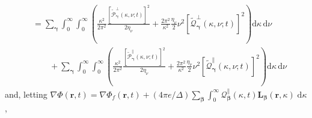 \documentclass{article}
\begin{document}
\begin{equation}
\begin{split}
&= \sum_{\bm{\gamma}}\int_0^\infty\int_0^\infty\left(\frac{\kappa^2}{2\pi^2}\frac{\left[\tilde{\mathcal{P}}_{\bm{\gamma}}^\perp(\kappa,\nu;t)\right]^2}{2\eta_\nu} + \frac{2\pi^2}{\kappa^2}\frac{\eta_\nu}{2}\nu^2\left[\tilde{\mathcal{Q}}_{\bm{\gamma}}^\perp(\kappa,\nu;t)\right]^2\right)\mathrm{d}\kappa\,\mathrm{d}\nu\\
&\qquad + \sum_{\bm{\gamma}}\int_0^\infty\int_0^\infty\left(\frac{\kappa^2}{2\pi^2}\frac{\left[\tilde{\mathcal{P}}_{\bm{\gamma}}^\parallel(\kappa,\nu;t)\right]^2}{2\eta_\nu} + \frac{2\pi^2}{\kappa^2}\frac{\eta_\nu}{2}\nu^2\left[\tilde{\mathcal{Q}}_{\bm{\gamma}}^\parallel(\kappa,\nu;t)\right]^2\right)\mathrm{d}\kappa\,\mathrm{d}\nu
\end{split}
\end{equation}
and, letting $\nabla\Phi(\mathbf{r},t) = \nabla\Phi_f(\mathbf{r},t) + (4\pi e/\Delta)\sum_{\bm{\beta}}\int_0^\infty\mathcal{Q}_{\bm{\beta}}^\parallel(\kappa,t)\mathbf{L}_{\bm{\beta}}(\mathbf{r},\kappa)\;\mathrm{d}\kappa$,
\end{document}
